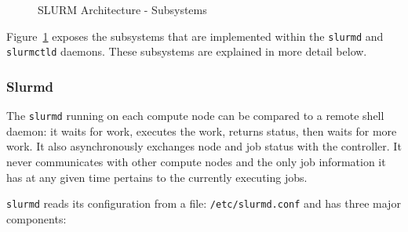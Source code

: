 \begin{figure}[tb]
\centerline{}
\caption{SLURM Architecture - Subsystems}
\label{archdetail}
\end{figure}

Figure~\ref{archdetail} exposes the subsystems that are implemented
within the {\tt slurmd} and {\tt slurmctld} daemons.  These subsystems
are explained in more detail below.

\subsubsection{Slurmd}

The {\tt slurmd} running on each compute node can be compared to a remote
shell daemon:  it waits for work, executes the work, returns status,
then waits for more work.  It also asynchronously exchanges node and job
status with the controller.  It never communicates with other compute
nodes and the only job information it has at any given time pertains to
the currently executing jobs.

{\tt slurmd} reads its configuration from a file: {\tt /etc/slurmd.conf}
and has three major components:


